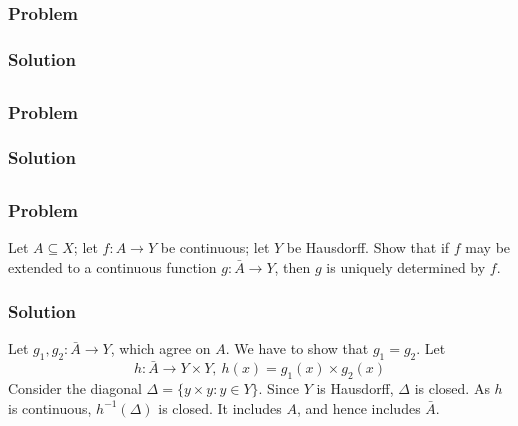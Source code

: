 
\setcounter{subsection}{3} %
\subsection{}

\subsubsection{Problem}

\subsubsection{Solution}


\setcounter{subsection}{4} %
\subsection{}

\subsubsection{Problem}

\subsubsection{Solution}


\setcounter{subsection}{12} %
\subsection{}

\subsubsection{Problem}
Let $A \subseteq X$; let $f : A \to Y$ be continuous; let $Y$ be Hausdorff. Show that if $f$ may be extended to a continuous function $g : \bar A \to Y$, then $g$ is uniquely determined by $f$.

\subsubsection{Solution}
Let $g_1, g_2 : \bar A \to Y$, which agree on $A$. We have to show that $g_1 = g_2$. Let
\[h : \bar A \to Y \times Y,\ h(x) = g_1(x) \times g_2(x) \]
Consider the diagonal $\Delta = \{ y \times y : y \in Y\}$. Since $Y$ is Hausdorff, $\Delta$ is closed. As $h$ is continuous, $h^{-1}(\Delta)$ is closed. It includes $A$, and hence includes $\bar A$.
